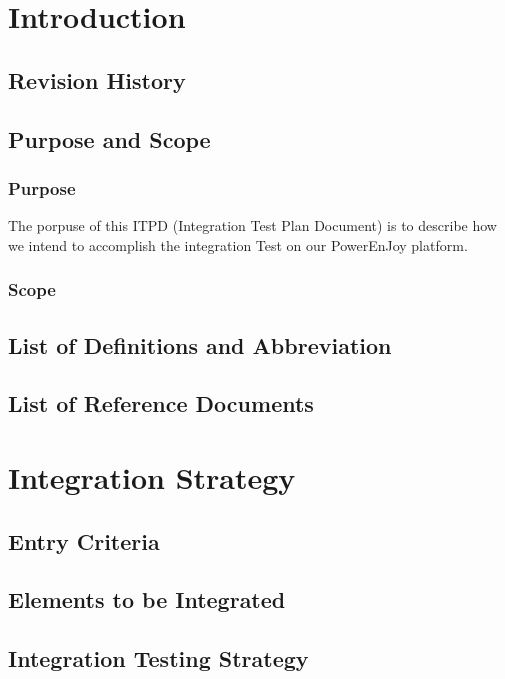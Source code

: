 \documentclass{article}
\begin{document}
\title{}
\author{Boriero Stefano  876106  
Brunitti Simone   875039 }


\maketitle

\newpage
\tableofcontents

\section{Introduction}
\newpage
\subsection{Revision History}
\subsection{Purpose and Scope}
\subsubsection{Purpose}
The porpuse of this ITPD (Integration Test Plan Document) is to describe how we intend to accomplish the integration Test on our PowerEnJoy platform.
\subsubsection{Scope}
\subsection{List of Definitions and	Abbreviation}
\subsection{List of Reference Documents}
\newpage
\section{Integration Strategy}
\subsection{Entry Criteria}
\subsection{Elements to be Integrated}
\subsection{Integration Testing Strategy}
\end{document}

